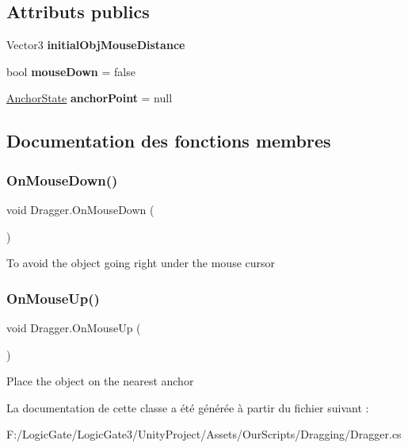 \subsection*{Attributs publics}
\begin{DoxyCompactItemize}
\item 
\mbox{\label{class_dragger_a1d16edf9f508d52493bda6130d9188d7}} 
Vector3 {\bfseries initial\+Obj\+Mouse\+Distance}
\item 
\mbox{\label{class_dragger_a916c768cb219dee4d24ab41d869f1b4b}} 
bool {\bfseries mouse\+Down} = false
\item 
\mbox{\label{class_dragger_ae6877a2d7c8622dbebad040d764cc70e}} 
\mbox{\hyperlink{class_anchor_state}{Anchor\+State}} {\bfseries anchor\+Point} = null
\end{DoxyCompactItemize}


\subsection{Documentation des fonctions membres}
\mbox{\label{class_dragger_a0c35e5fa5a41f5f0ba823ecc94d94801}} 
\subsubsection{\texorpdfstring{On\+Mouse\+Down()}{OnMouseDown()}}
{\footnotesize\ttfamily void Dragger.\+On\+Mouse\+Down (\begin{DoxyParamCaption}{ }\end{DoxyParamCaption})}

To avoid the object going right under the mouse cursor \mbox{\label{class_dragger_a6fefaac4e505d917405736eafa051463}} 
\subsubsection{\texorpdfstring{On\+Mouse\+Up()}{OnMouseUp()}}
{\footnotesize\ttfamily void Dragger.\+On\+Mouse\+Up (\begin{DoxyParamCaption}{ }\end{DoxyParamCaption})}

Place the object on the nearest anchor 

La documentation de cette classe a été générée à partir du fichier suivant \+:\begin{DoxyCompactItemize}
\item 
F\+:/\+Logic\+Gate/\+Logic\+Gate3/\+Unity\+Project/\+Assets/\+Our\+Scripts/\+Dragging/Dragger.\+cs\end{DoxyCompactItemize}
